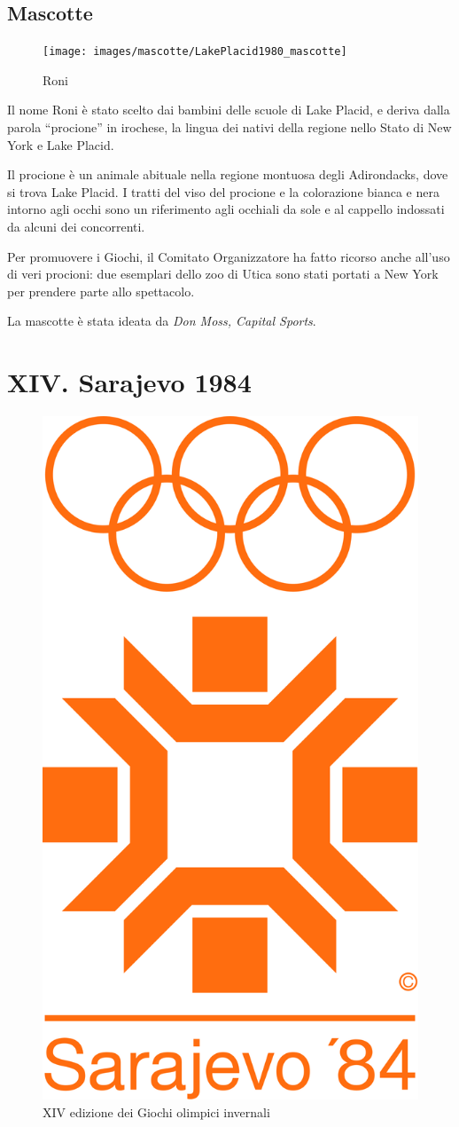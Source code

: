 \documentclass[
]{book}
\begin{document}
\section*{Mascotte}\label{mascotte-2}

\begin{figure}
\texttt{[image: images/mascotte/LakePlacid1980\_mascotte]} \caption{Roni}\label{fig:unnamed-chunk-44}
\end{figure}

Il nome Roni è stato scelto dai bambini delle scuole di Lake Placid, e deriva dalla parola ``procione'' in irochese, la lingua dei nativi della regione nello Stato di New York e Lake Placid.

Il procione è un animale abituale nella regione montuosa degli Adirondacks, dove si trova Lake Placid. I tratti del viso del procione e la colorazione bianca e nera intorno agli occhi sono un riferimento agli occhiali da sole e al cappello indossati da alcuni dei concorrenti.

Per promuovere i Giochi, il Comitato Organizzatore ha fatto ricorso anche all'uso di veri procioni: due esemplari dello zoo di Utica sono stati portati a New York per prendere parte allo spettacolo.

La mascotte è stata ideata da \emph{Don Moss, Capital Sports}.

\chapter*{XIV. Sarajevo 1984}\label{xiv.-sarajevo-1984}

\begin{figure}
\includegraphics[width=0.4\linewidth]{images/loghi/1984} \caption{XIV edizione dei Giochi olimpici invernali}\label{fig:unnamed-chunk-45}
\end{figure}
\end{document}
